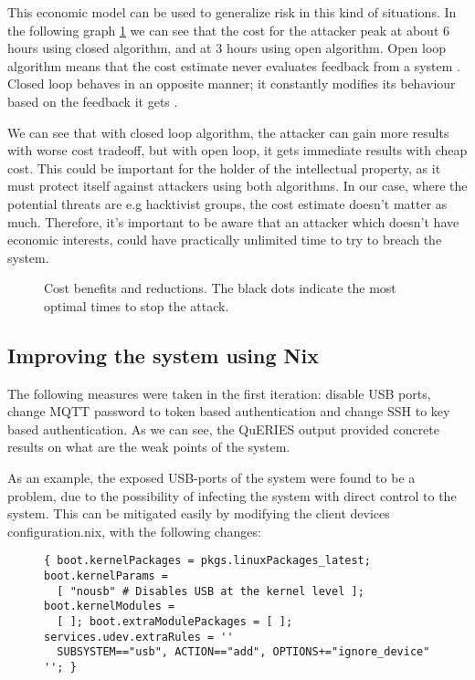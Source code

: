 This economic model can be used to generalize risk in this kind of
situations. In the following graph \ref{openandclosed} we can see that
the cost for the attacker peak at about 6 hours using closed algorithm, and
at 3 hours using open algorithm. Open loop algorithm means that the cost
estimate never evaluates feedback from a system
\cite{bars2006theory}. Closed loop behaves in an opposite manner; it
constantly modifies its behaviour based on the feedback it gets \cite{bars2006theory}.

We can see that with closed loop algorithm, the attacker can gain more
results with worse cost tradeoff, but with open loop, it gets
immediate results with cheap cost. This could be important for the
holder of the intellectual property, as it must protect itself against
attackers using both algorithms. In our case, where the potential
threats are e.g hacktivist groups, the cost estimate doesn't matter as
much. Therefore, it's important to be aware that an attacker which
doesn't have economic interests, could have practically unlimited time
to try to breach the system.

\begin{figure}[t!]
\centerline{}
\caption{Cost benefits and reductions. The black dots indicate the
  most optimal times to stop the attack.}
\label{openandclosed}
\end{figure}

\subsection{Improving the system using Nix}

The following measures were taken in the first iteration: disable USB
ports, change MQTT password to token based authentication and change
SSH to key based authentication. As we can see, the QuERIES output
provided concrete results on what are the weak points of the system.

As an example, the exposed USB-ports of the system were found to be a
problem, due to the possibility of infecting the system with direct
control to the system. This can be mitigated easily by modifying the
client devices configuration.nix, with the following changes:

\begin{figure}[H]
\begin{lstlisting} 
{ boot.kernelPackages = pkgs.linuxPackages_latest; boot.kernelParams =
  [ "nousb" # Disables USB at the kernel level ]; boot.kernelModules =
  [ ]; boot.extraModulePackages = [ ]; services.udev.extraRules = ''
  SUBSYSTEM=="usb", ACTION=="add", OPTIONS+="ignore_device" ''; }
\end{lstlisting}
\label{kernelsnippet}
\end{figure}

